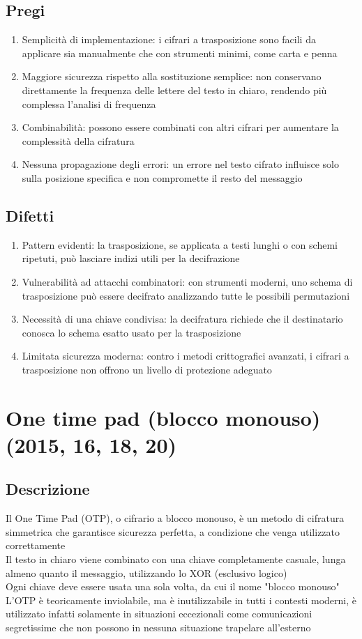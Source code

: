 \documentclass[10pt,oneside,a4paper]{article}
\begin{document}
\subsection{Pregi}
\begin{enumerate}
\item Semplicità di implementazione: i cifrari a trasposizione sono facili da applicare sia manualmente che con strumenti minimi, come carta e penna
\item Maggiore sicurezza rispetto alla sostituzione semplice: non conservano direttamente la frequenza delle lettere del testo in chiaro, rendendo più complessa l'analisi di frequenza
\item Combinabilità: possono essere combinati con altri cifrari per aumentare la complessità della cifratura
\item Nessuna propagazione degli errori: un errore nel testo cifrato influisce solo sulla posizione specifica e non compromette il resto del messaggio
\end{enumerate}
\subsection{Difetti}
\begin{enumerate}
\item Pattern evidenti: la trasposizione, se applicata a testi lunghi o con schemi ripetuti, può lasciare indizi utili per la decifrazione
\item Vulnerabilità ad attacchi combinatori: con strumenti moderni, uno schema di trasposizione può essere decifrato analizzando tutte le possibili permutazioni
\item Necessità di una chiave condivisa: la decifratura richiede che il destinatario conosca lo schema esatto usato per la trasposizione
\item Limitata sicurezza moderna: contro i metodi crittografici avanzati, i cifrari a trasposizione non offrono un livello di protezione adeguato
\end{enumerate}
\section{One time pad (blocco monouso) (2015, 16, 18, 20)}
\subsection{Descrizione}
Il One Time Pad (OTP), o cifrario a blocco monouso, è un metodo di cifratura simmetrica che garantisce sicurezza perfetta, a condizione che venga utilizzato correttamente\\
Il testo in chiaro viene combinato con una chiave completamente casuale, lunga almeno quanto il messaggio, utilizzando lo XOR (esclusivo logico)\\
Ogni chiave deve essere usata una sola volta, da cui il nome "blocco monouso"\\  
L'OTP è teoricamente inviolabile, ma è inutilizzabile in tutti i contesti moderni, è utilizzato infatti solamente in situazioni eccezionali come comunicazioni segretissime che non possono in nessuna situazione trapelare all'esterno
\end{document}
